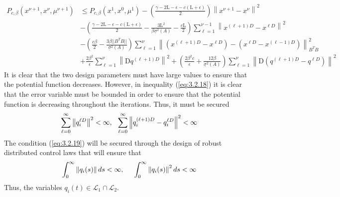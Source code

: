     \begin{equation}\label{eq:3.2.18}
        \begin{align}
            P_{c, \beta} \left(x^{\nu + 1}, x^{\nu}, \mu^{\nu + 1}\right)   
            &\leq P_{c, \beta} \left(x^{1}, x^{0}, \mu^{1}\right) -\left( \frac{\gamma - 2\mathrm{L} - \epsilon - c(\mathrm{L} + \epsilon)}{2} \right)\left \lVert x^{\nu + 1} - x^{\nu} \right \rVert^2\\
             &- \left( \frac{\gamma - 2\mathrm{L} - \epsilon - c(\mathrm{L} + \epsilon)}{2} - \frac{3\mathrm{L}^2}{\beta \underline{\sigma}^2(A)} - \frac{c\mathrm{L}}{2}\right) \sum_{\ell = 1}^{\nu - 1} \left \lVert x^{(\ell + 1)D} - x^{\ell D} \right \rVert^2\\
             &- \left(\frac{c\beta}{2} - \frac{3\beta ||B^TB||}{\underline{\sigma}^2(A)}\right) \sum_{\ell = 1}^{\nu}\left \lVert \left(x^{(\ell + 1)D} -x^{\ell D}\right) - \left( x^{\ell D} - x^{(\ell - 1)D} \right)  \right \rVert^2_{B^TB}
             \\ &+ \frac{2\beta^2}{\epsilon} \sum_{\ell = 1}^{\nu} \left \lVert \mathrm{D}q^{(\ell + 1)D} \right \rVert^2 + \left ( \frac{2\beta^2c}{\epsilon} + \frac{12\beta}{\underline{\sigma}^2(A)}\right) \sum_{\ell = 1}^{\nu} \left \lVert \mathrm{D}(q^{(\ell + 1)D} - q^{\ell D}) \right \rVert^2
        \end{align}
    \end{equation}
    It is clear that the two design parameters must have large values to ensure that the potential function decreases. However, in inequality (\ref{eq:3.2.18}) it is clear that the error variable must be bounded in order to ensure that the potential function is decreasing throughout the iterations. Thus, it must be secured
    \begin{equation}\label{eq:3.2.19}
        \sum_{\ell = 0}^{\infty}\left \lVert q_i^{\ell D}\right\rVert^2 < \infty, \hspace{2.5mm} \sum_{\ell = 0}^{\infty} \left \lVert q_i^{(\ell + 1)D} - q_i^{\ell D} \right \rVert^2 < \infty
    \end{equation}
    The condition (\ref{eq:3.2.19}) will be secured through the design of robust distributed control laws that will ensure that
    \begin{equation}\label{eq:3.2.20}
        \int_{0}^{\infty} \left \lVert q_i(s) \right \rVert ds < \infty, \hspace{5.0mm} \int_{0}^{\infty} \left \lVert q_i(s) \right \rVert^2 ds < \infty
    \end{equation}
    Thus, the variables $q_i(t) \in \mathcal{L}_1 \cap \mathcal{L}_2$.

